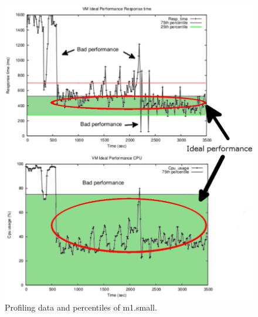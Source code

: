 \begin{enumerate}
\begin{figure}
  \begin{center}
    \includegraphics[width=\linewidth]{images/idealSmallRemark.pdf}
  \end{center}
\vspace{-5mm}
  \caption{Profiling data and percentiles of m1.small.}
  \label{fig:vm_performance1}
\end{figure}


\end{enumerate}

